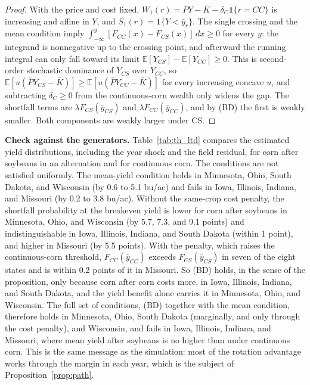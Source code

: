 \documentclass[11pt,letterpaper]{article}
\theoremstyle{remark}
\begin{document}
\begin{proof}
With the price and cost fixed, $W_1(r)=\bar P Y-\bar K-\delta_C\mathbf 1\{r=CC\}$ is increasing and affine in $Y$, and $S_1(r)=\mathbf 1\{Y<\bar y_r\}$. The single crossing and the mean condition imply $\int_{-\infty}^{y}[F_{CC}(x)-F_{CS}(x)]\,dx\ge0$ for every $y$: the integrand is nonnegative up to the crossing point, and afterward the running integral can only fall toward its limit $\mathbb{E}[Y_{CS}]-\mathbb{E}[Y_{CC}]\ge0$. This is second-order stochastic dominance of $Y_{CS}$ over $Y_{CC}$, so $\mathbb{E}[u(\bar PY_{CS}-\bar K)]\ge\mathbb{E}[u(\bar PY_{CC}-\bar K)]$ for every increasing concave $u$, and subtracting $\delta_C\ge0$ from the continuous-corn wealth only widens the gap. The shortfall terms are $\lambda F_{CS}(\bar y_{CS})$ and $\lambda F_{CC}(\bar y_{CC})$, and by (BD) the first is weakly smaller. Both components are weakly larger under CS.
\end{proof}

\textbf{Check against the generators.} Table~\ref{tab:th_ltd} compares the estimated yield distributions, including the year shock and the field residual, for corn after soybeans in an alternation and for continuous corn. The conditions are not satisfied uniformly. The mean-yield condition holds in Minnesota, Ohio, South Dakota, and Wisconsin (by 0.6 to 5.1 bu/ac) and fails in Iowa, Illinois, Indiana, and Missouri (by 0.2 to 3.8 bu/ac). Without the same-crop cost penalty, the shortfall probability at the breakeven yield is lower for corn after soybeans in Minnesota, Ohio, and Wisconsin (by 5.7, 7.3, and 9.1 points) and indistinguishable in Iowa, Illinois, Indiana, and South Dakota (within 1 point), and higher in Missouri (by 5.5 points). With the penalty, which raises the continuous-corn threshold, $F_{CC}(\bar y_{CC})$ exceeds $F_{CS}(\bar y_{CS})$ in seven of the eight states and is within 0.2 points of it in Missouri. So (BD) holds, in the sense of the proposition, only because corn after corn costs more, in Iowa, Illinois, Indiana, and South Dakota, and the yield benefit alone carries it in Minnesota, Ohio, and Wisconsin. The full set of conditions, (BD) together with the mean condition, therefore holds in Minnesota, Ohio, South Dakota (marginally, and only through the cost penalty), and Wisconsin, and fails in Iowa, Illinois, Indiana, and Missouri, where mean yield after soybeans is no higher than under continuous corn. This is the same message as the simulation: most of the rotation advantage works through the margin in each year, which is the subject of Proposition~\ref{prop:path}.
\end{document}

